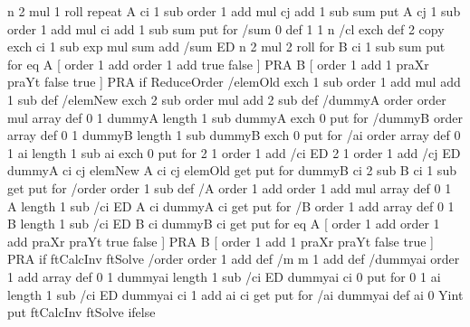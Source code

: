 {{{{        n 2 mul 1 roll
      } repeat
      A
      ci 1 sub order 1 add mul cj add 1 sub
      sum put %
      A
      cj 1 sub order 1 add mul ci add 1 sub
      sum put %
    } for
    /sum 0 def
    1 1 n { /cl exch def
      2 copy
      exch
      ci 1 sub exp mul sum add /sum ED
      n 2 mul 2 roll
    } for
    B
    ci 1 sub
    sum put
  } for
  \Pst@Debug{} eq {
  A [ order 1 add order 1 add \psk@MaPos\space \psk@MaScale\space true false ] PRA
  B [ order 1 add 1 praXr praYt \psk@MaScale\space false true ] PRA
  } if
  ReduceOrder {
    /elemOld { exch 1 sub order 1 add mul add 1 sub } def
    /elemNew { exch 2 sub order mul add 2 sub  } def     
    /dummyA order order mul array def                    
    0 1 dummyA length 1 sub { dummyA exch 0 put } for  
    /dummyB order array def
    0 1 dummyB length 1 sub { dummyB exch 0 put } for
    /ai order array def
    0 1 ai length 1 sub { ai exch 0 put } for
    2 1 order 1 add {/ci ED
      2 1 order 1 add {/cj ED
        dummyA ci cj elemNew
        A ci cj elemOld get
        put
      } for
      dummyB ci 2 sub
      B ci 1 sub get
      put
    } for
  /order order 1 sub def                                             %
  /A order 1 add order 1 add mul array def 0 1 A length 1 sub {/ci ED A ci dummyA ci get put } for  %
  /B order 1 add array def 0 1 B length 1 sub {/ci ED B ci dummyB ci get put } for                  %
  \Pst@Debug{} eq {
  A [ order 1 add order 1 add praXr praYt \psk@MaScale\space true false ] PRA
  B [ order 1 add 1 praXr praYt \psk@MaScale\space false true ] PRA } if
  ftCalcInv ftSolve
  /order order 1 add def                                             %
  /m m 1 add def
  /dummyai order 1 add array def
  0 1 dummyai length 1 sub {/ci ED dummyai ci 0 put } for
  0 1 ai length 1 sub {/ci ED dummyai ci 1 add ai ci get put } for
  /ai dummyai def
  ai 0 Yint put
  }{ ftCalcInv ftSolve } ifelse
}
